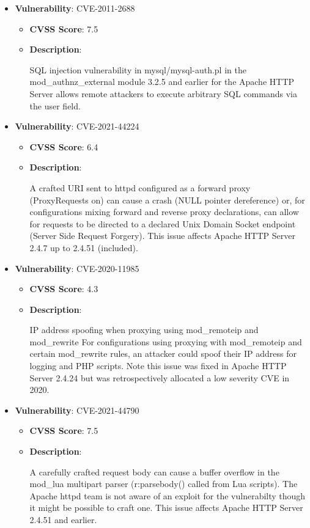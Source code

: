 \documentclass{article}
\begin{document}
\begin{itemize}
        \item \textbf{Vulnerability}: CVE-2011-2688
        \begin{itemize}
            \item \textbf{CVSS Score}:  7.5 
            \item \textbf{Description}:
            \parbox[t]{0.9\linewidth}{
                \ttfamily SQL injection vulnerability in mysql/mysql-auth.pl in the mod\_authnz\_external module 3.2.5 and earlier for the Apache HTTP Server allows remote attackers to execute arbitrary SQL commands via the user field.
            }
        \end{itemize}
    
        \item \textbf{Vulnerability}: CVE-2021-44224
        \begin{itemize}
            \item \textbf{CVSS Score}:  6.4 
            \item \textbf{Description}:
            \parbox[t]{0.9\linewidth}{
                \ttfamily A crafted URI sent to httpd configured as a forward proxy (ProxyRequests on) can cause a crash (NULL pointer dereference) or, for configurations mixing forward and reverse proxy declarations, can allow for requests to be directed to a declared Unix Domain Socket endpoint (Server Side Request Forgery). This issue affects Apache HTTP Server 2.4.7 up to 2.4.51 (included).
            }
        \end{itemize}
    
        \item \textbf{Vulnerability}: CVE-2020-11985
        \begin{itemize}
            \item \textbf{CVSS Score}:  4.3 
            \item \textbf{Description}:
            \parbox[t]{0.9\linewidth}{
                \ttfamily IP address spoofing when proxying using mod\_remoteip and mod\_rewrite For configurations using proxying with mod\_remoteip and certain mod\_rewrite rules, an attacker could spoof their IP address for logging and PHP scripts. Note this issue was fixed in Apache HTTP Server 2.4.24 but was retrospectively allocated a low severity CVE in 2020.
            }
        \end{itemize}
    
        \item \textbf{Vulnerability}: CVE-2021-44790
        \begin{itemize}
            \item \textbf{CVSS Score}:  7.5 
            \item \textbf{Description}:
            \parbox[t]{0.9\linewidth}{
                \ttfamily A carefully crafted request body can cause a buffer overflow in the mod\_lua multipart parser (r:parsebody() called from Lua scripts). The Apache httpd team is not aware of an exploit for the vulnerabilty though it might be possible to craft one. This issue affects Apache HTTP Server 2.4.51 and earlier.
            }
        \end{itemize}
    

\end{itemize}
\end{document}

